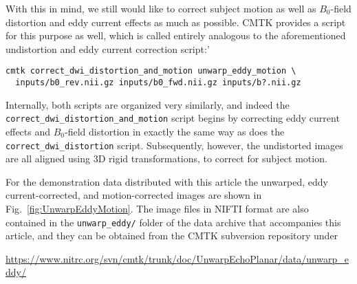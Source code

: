 \documentclass{InsightArticle}
\begin{document}
With this in mind, we still would like to correct subject motion as well as
$B_0$-field distortion and eddy current effects as much as possible. CMTK
provides a script for this purpose as well, which is called entirely analogous
to the aforementioned undistortion and eddy current correction script:'
\begin{verbatim}
cmtk correct_dwi_distortion_and_motion unwarp_eddy_motion \
  inputs/b0_rev.nii.gz inputs/b0_fwd.nii.gz inputs/b?.nii.gz
\end{verbatim}

Internally, both scripts are organized very similarly, and indeed the
\verb|correct_dwi_distortion_and_motion| script begins by correcting eddy
current effects and $B_0$-field distortion in exactly the same way as does the
\verb|correct_dwi_distortion| script. Subsequently, however, the undistorted
images are all aligned using 3D rigid transformations, to correct for subject
motion.

For the demonstration data distributed with this article the unwarped, eddy
current-corrected, and motion-corrected images are shown in
Fig.~\ref{fig:UnwarpEddyMotion}. The image files in NIFTI format are
also contained in the \verb|unwarp_eddy/| folder of the data archive that
accompanies this article, and they can be obtained from the CMTK subversion
repository under

\centerline{\url{https://www.nitrc.org/svn/cmtk/trunk/doc/UnwarpEchoPlanar/data/unwarp_eddy/}}
\end{document}
